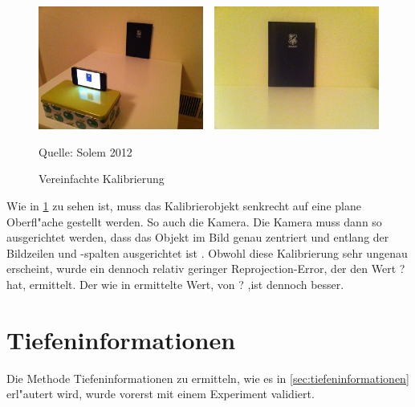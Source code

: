 \begin{figure}[H]
	\includegraphics[scale=1.0]{bilder/simple_calib}
	\caption[Vereinfachte Kalibrierung]{Vereinfachte Kalibrierung}
	\small Quelle: Solem 2012
	\label{fig:simplecalib}%
\end{figure}

\noindent Wie in \ref{fig:simplecalib} zu sehen ist, muss das Kalibrierobjekt senkrecht auf eine plane Oberfl"ache gestellt werden. So auch die Kamera. Die Kamera muss dann so ausgerichtet werden, dass das Objekt im Bild genau zentriert und entlang der Bildzeilen und -spalten ausgerichtet ist \cite{CVF}.\newline
Obwohl diese Kalibrierung sehr ungenau erscheint, wurde ein dennoch relativ geringer Reprojection-Error, der den Wert ? hat, ermittelt. Der wie in \cite{cal} ermittelte Wert, von ? ,ist dennoch besser.

\section{Tiefeninformationen}
\label{sec:expiefeninformationen2}

Die Methode Tiefeninformationen zu ermitteln, wie es in \ref{sec:tiefeninformationen} erl"autert wird, wurde vorerst mit einem Experiment validiert.

